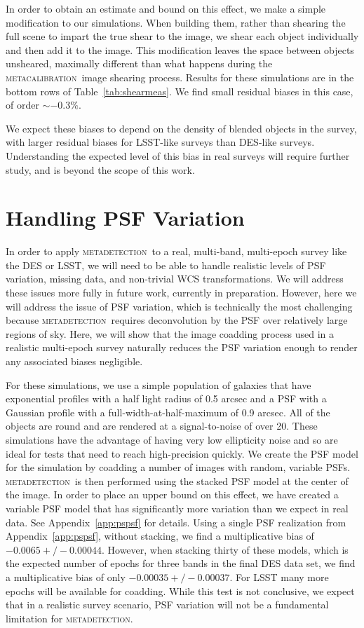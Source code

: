 \documentclass[fleqn,useAMS,usenatbib]{mnras}
\newcommand{\mcal}{\textsc{metacalibration}}
\newcommand{\mdet}{\textsc{metadetection}}
\begin{document}
In order to obtain an estimate and bound on this effect, we make a simple
modification to our simulations. When building them, rather than shearing the
full scene to impart the true shear to the image, we shear each object
individually and then add it to the image. This modification leaves the space
between objects unsheared, maximally different than what happens during the
\mcal\ image shearing process. Results for these simulations are in the bottom
rows of Table~\ref{tab:shearmeas}. We find small residual biases in this case,
of order $\sim-0.3\%$.

We expect these biases to depend on the density of blended objects in the
survey, with larger residual biases for LSST-like surveys than DES-like
surveys.  Understanding the expected level of this bias in real surveys will
require further study, and is beyond the scope of this work.

\section{Handling PSF Variation}
\label{sec:psfvar}

In order to apply \mdet\ to a real, multi-band, multi-epoch survey like the DES
or LSST, we will need to be able to handle realistic levels of PSF variation,
missing data, and non-trivial WCS transformations. We will address these issues
more fully in future work, currently in preparation. However, here we will
address the issue of PSF variation, which is technically the most challenging
because \mdet\ requires deconvolution by the PSF over relatively large regions
of sky. Here, we will show that the image coadding process used in a realistic
multi-epoch survey naturally reduces the PSF variation enough to render any
associated biases negligible.

For these simulations, we use a simple population of galaxies that have
exponential profiles with a half light radius of 0.5 arcsec and a PSF with a
Gaussian profile with a full-width-at-half-maximum of 0.9 arcsec. All of the
objects are round and are rendered at a signal-to-noise of over 20. These
simulations have the advantage of having very low ellipticity noise and so are
ideal for tests that need to reach high-precision quickly. We create the PSF
model for the simulation by coadding a number of images with random, variable PSFs.
\mdet\ is then performed using the stacked PSF model at the center of
the image. In order to place an upper bound on this effect, we have created a
variable PSF model that has significantly more variation than we expect in real
data. See Appendix~\ref{app:pspsf} for details.  Using a single PSF realization
from Appendix~\ref{app:pspsf}, without stacking, we find a multiplicative bias
of $-0.0065 +/- 0.00044$.  However, when stacking thirty of these models, which
is the expected number of epochs for three bands in the final DES data set, we
find a multiplicative bias of only $-0.00035 +/- 0.00037$.  For LSST many more
epochs will be available for coadding.   While this test is not conclusive, we
expect that in a realistic survey scenario, PSF variation will not be a
fundamental limitation for \mdet.
\end{document}

